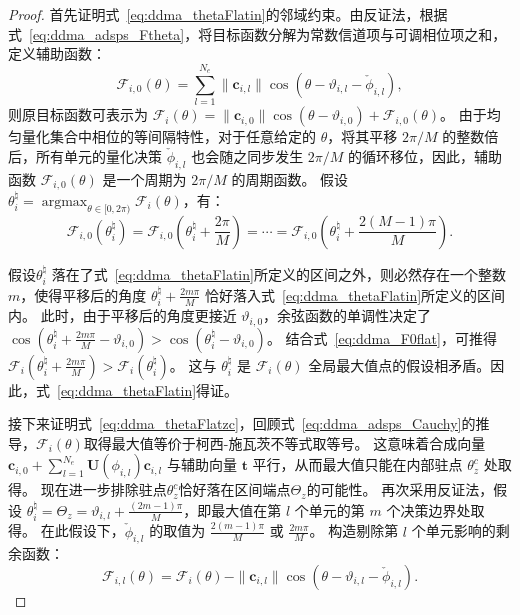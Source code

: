 \begin{proof}
	首先证明式~\eqref{eq:ddma_thetaFlatin}的邻域约束。由反证法，根据式~\eqref{eq:ddma_adsps_Ftheta}，将目标函数分解为常数信道项与可调相位项之和，定义辅助函数：
	\begin{equation}\label{eq:ddma_F0}
		\mathcal F_{i,0}(\theta) = \sum_{l=1}^{N_e} \|\bm{c}_{i,l}\| \cos(\theta - \vartheta_{i,l} - \check{\phi}_{i,l}),
	\end{equation}
	则原目标函数可表示为 $\mathcal F_i(\theta) = \|\bm{c}_{i,0}\| \cos(\theta - \vartheta_{i,0}) + \mathcal F_{i,0}(\theta)$。
	由于均匀量化集合中相位的等间隔特性，对于任意给定的 $\theta$，将其平移 $2\pi/M$ 的整数倍后，所有单元的量化决策 $\check{\phi}_{i,l}$ 也会随之同步发生 $2\pi/M$ 的循环移位，因此，辅助函数 $\mathcal F_{i,0}(\theta)$ 是一个周期为 $2\pi/M$ 的周期函数。
	假设$\theta_i^{\natural} = \mathop{\arg\max}_{\theta \in [0,2\pi)} \mathcal{F}_i(\theta)$，有：
	\begin{equation}\label{eq:ddma_F0flat}
		\mathcal F_{i,0}(\theta_i^{\natural}) = \mathcal F_{i,0}\left(\theta_i^{\natural} + \frac{2\pi}{M}\right) = \cdots = \mathcal F_{i,0}\left(\theta_i^{\natural} + \frac{2(M-1)\pi}{M}\right).
	\end{equation}
	
	假设$\theta_i^{\natural}$ 落在了式~\eqref{eq:ddma_thetaFlatin}所定义的区间之外，则必然存在一个整数$m$，使得平移后的角度 $\theta_i^{\natural} + \frac{2m\pi}{M}$ 恰好落入式~\eqref{eq:ddma_thetaFlatin}所定义的区间内。
	此时，由于平移后的角度更接近 $\vartheta_{i,0}$，余弦函数的单调性决定了 $\cos(\theta_i^{\natural} + \frac{2m\pi}{M} - \vartheta_{i,0}) > \cos(\theta_i^{\natural} - \vartheta_{i,0})$。
	结合式~\eqref{eq:ddma_F0flat}，可推得 $\mathcal{F}_i(\theta_i^{\natural} + \frac{2m\pi}{M}) > \mathcal{F}_i(\theta_i^{\natural})$。
	这与 $\theta_i^{\natural}$ 是 $\mathcal{F}_i(\theta)$ 全局最大值点的假设相矛盾。因此，式~\eqref{eq:ddma_thetaFlatin}得证。
	
	接下来证明式~\eqref{eq:ddma_thetaFlatzc}，回顾式~\eqref{eq:ddma_adsps_Cauchy}的推导，$\mathcal{F}_i(\theta)$取得最大值等价于柯西-施瓦茨不等式取等号。
	这意味着合成向量 $\bm{c}_{i,0} + \sum_{l=1}^{N_e} \bm{U}(\phi_{i,l}) \bm{c}_{i,l}$ 与辅助向量 $\bm{t}$ 平行，从而最大值只能在内部驻点 $\theta_z^c$ 处取得。
	现在进一步排除驻点$\theta_z^c$恰好落在区间端点$\Theta_z$的可能性。
	再次采用反证法，假设 $\theta_i^{\natural} = \Theta_z = \vartheta_{i,l} + \frac{(2m-1)\pi}{M}$，即最大值在第 $l$ 个单元的第 $m$ 个决策边界处取得。
	在此假设下，$\check{\phi}_{i,l}$ 的取值为 $\frac{2(m-1)\pi}{M}$ 或 $\frac{2m\pi}{M}$。
	构造剔除第 $l$ 个单元影响的剩余函数：
	\begin{equation}\label{eq:ddma_Fil}
		\mathcal F_{i,l}(\theta) = \mathcal F_i(\theta) - \|\bm{c}_{i,l}\| \cos(\theta - \vartheta_{i,l} - \check{\phi}_{i,l}).
	\end{equation}
	

\end{proof}
